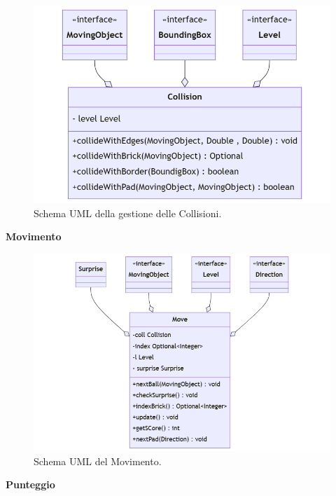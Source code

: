 \documentclass[a4paper,12pt]{report}
\begin{document}
\begin{figure}[H]
    \centering{}
    \includegraphics[scale=0.6]{images/Collision.png}
    \caption{Schema UML della gestione delle Collisioni.}
    \label{images:Collision}
\end{figure}
\textbf{Movimento}\\
\begin{figure}[H]
    \centering{}
    \includegraphics[scale=0.6]{images/Move.png}
    \caption{Schema UML del Movimento.}
    \label{images:Move}
\end{figure}
\textbf{Punteggio}\\
\end{document}
